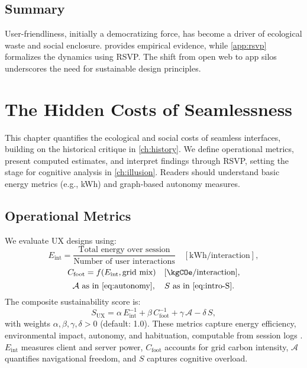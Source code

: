 \documentclass[openany]{book}
\newcommand{\Sent}{S} %
\newcommand{\Eint}{E_{\mathrm{int}}} %
\newcommand{\Cfoot}{C_{\mathrm{foot}}} %
\newcommand{\Auton}{\mathcal{A}} %
\newcommand{\SUX}{S_{\mathrm{UX}}} %
\newcommand{\kWh}{\mathrm{kWh}}
\begin{document}
\section{Summary}
User-friendliness, initially a democratizing force, has become a driver of ecological waste and social enclosure.  provides empirical evidence, while \cref{app:rsvp} formalizes the dynamics using RSVP. The shift from open web to app silos underscores the need for sustainable design principles.

\chapter{The Hidden Costs of Seamlessness}
\label{ch:hidden-costs}

This chapter quantifies the ecological and social costs of seamless interfaces, building on the historical critique in \cref{ch:history}. We define operational metrics, present computed estimates, and interpret findings through RSVP, setting the stage for cognitive analysis in \cref{ch:illusion}. Readers should understand basic energy metrics (e.g., kWh) and graph-based autonomy measures.

\section{Operational Metrics}
\label{sec:metrics-def}
We evaluate UX designs using:
\begin{equation}
\Eint = \frac{\text{Total energy over session}}{\text{Number of user interactions}} \quad [\kWh/\text{interaction}],
\end{equation}
\begin{equation}
\Cfoot = f(\Eint, \text{grid mix}) \quad [\kgCOe/\text{interaction}],
\end{equation}
\begin{equation}
\Auton \text{ as in \cref{eq:autonomy}}, \quad \Sent \text{ as in \cref{eq:intro-S}}.
\end{equation}
The composite sustainability score is:
\begin{equation}
\label{eq:SUX}
\SUX = \alpha\,\Eint^{-1} + \beta\,\Cfoot^{-1} + \gamma\,\Auton - \delta\,\Sent,
\end{equation}
with weights \(\alpha, \beta, \gamma, \delta > 0\) (default: 1.0). These metrics capture energy efficiency, environmental impact, autonomy, and habituation, computable from session logs \citep{extentia2024}. \(\Eint\) measures client and server power, \(\Cfoot\) accounts for grid carbon intensity, \(\Auton\) quantifies navigational freedom, and \(\Sent\) captures cognitive overload.
\end{document}
